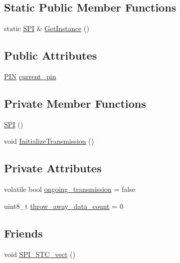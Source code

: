 \subsection*{Static Public Member Functions}
\begin{DoxyCompactItemize}
\item 
static \hyperlink{class_s_p_i___n_1_1_s_p_i}{S\+PI} \& \hyperlink{class_s_p_i___n_1_1_s_p_i_abc266ff9d817b8d4437d1da47fe8e7ae}{Get\+Instance} ()
\end{DoxyCompactItemize}
\subsection*{Public Attributes}
\begin{DoxyCompactItemize}
\item 
\hyperlink{struct_s_p_i___n_1_1_p_i_n}{P\+IN} \hyperlink{class_s_p_i___n_1_1_s_p_i_ac016c4eaed2db3f8b5523bf0d472ddd2}{current\+\_\+pin}
\end{DoxyCompactItemize}
\subsection*{Private Member Functions}
\begin{DoxyCompactItemize}
\item 
\hyperlink{class_s_p_i___n_1_1_s_p_i_a8fec1a6e642a5758acf974b92e28a9e6}{S\+PI} ()
\item 
void \hyperlink{class_s_p_i___n_1_1_s_p_i_af973a5b4a970c3c01430037d578151ef}{Initialize\+Transmission} ()
\end{DoxyCompactItemize}
\subsection*{Private Attributes}
\begin{DoxyCompactItemize}
\item 
volatile bool \hyperlink{class_s_p_i___n_1_1_s_p_i_a89115bf64f31cd26d0b6ed3292decabb}{ongoing\+\_\+transmission} = false
\item 
uint8\+\_\+t \hyperlink{class_s_p_i___n_1_1_s_p_i_aaed8cc6f36275c3e33fcada1b9172742}{throw\+\_\+away\+\_\+data\+\_\+count} = 0
\end{DoxyCompactItemize}
\subsection*{Friends}
\begin{DoxyCompactItemize}
\item 
void \hyperlink{class_s_p_i___n_1_1_s_p_i_a96543550133e0b0c6ae83faad5c0d68d}{S\+P\+I\+\_\+\+S\+T\+C\+\_\+vect} ()
\end{DoxyCompactItemize}
